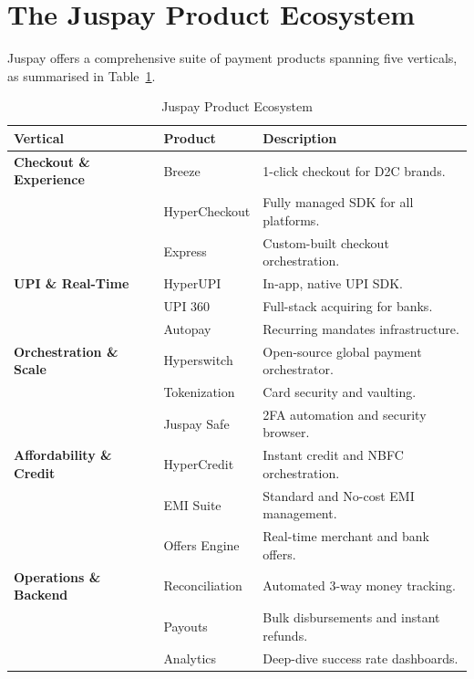 \section{The Juspay Product Ecosystem}

Juspay offers a comprehensive suite of payment products spanning five verticals, as summarised in Table~\ref{tab:juspay_products}.

\begin{table}[ht]
\centering
\caption{Juspay Product Ecosystem}
\label{tab:juspay_products}
\begin{tabular}{>{\bfseries}p{3.5cm} p{3.5cm} p{6.5cm}}
\toprule
\textbf{Vertical} & \textbf{Product} & \textbf{Description} \\
\midrule
Checkout \& Experience
  & Breeze         & 1-click checkout for D2C brands. \\
  & HyperCheckout  & Fully managed SDK for all platforms. \\
  & Express        & Custom-built checkout orchestration. \\
\midrule
UPI \& Real-Time
  & HyperUPI       & In-app, native UPI SDK. \\
  & UPI 360        & Full-stack acquiring for banks. \\
  & Autopay        & Recurring mandates infrastructure. \\
\midrule
Orchestration \& Scale
  & Hyperswitch    & Open-source global payment orchestrator. \\
  & Tokenization   & Card security and vaulting. \\
  & Juspay Safe    & 2FA automation and security browser. \\
\midrule
Affordability \& Credit
  & HyperCredit    & Instant credit and NBFC orchestration. \\
  & EMI Suite      & Standard and No-cost EMI management. \\
  & Offers Engine  & Real-time merchant and bank offers. \\
\midrule
Operations \& Backend
  & Reconciliation & Automated 3-way money tracking. \\
  & Payouts        & Bulk disbursements and instant refunds. \\
  & Analytics      & Deep-dive success rate dashboards. \\
\bottomrule
\end{tabular}
\end{table}

